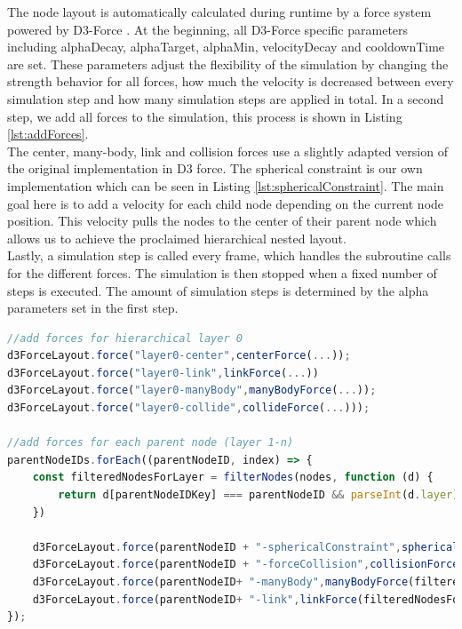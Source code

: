 The node layout is automatically calculated during runtime by a force system powered by D3-Force \cite{bostock_d3forcejs_nodate}. At the beginning, all D3-Force specific parameters including alphaDecay, alphaTarget, alphaMin, velocityDecay and cooldownTime are set. 
These parameters adjust the flexibility of the simulation by changing the strength behavior for all forces, how much the velocity is decreased between every simulation step and how many simulation steps are applied in total.
In a second step, we add all forces to the simulation, this process is shown in Listing \ref{lst:addForces}.\\
The center, many-body, link and collision forces use a slightly adapted version of the original implementation in D3 force. 
The spherical constraint is our own implementation which can be seen in Listing \ref{lst:sphericalConstraint}. The main goal here is to add a velocity for each child node depending on the current node position. This velocity pulls the nodes to the center of their parent node which allows us to achieve the proclaimed hierarchical nested layout.\\
Lastly, a simulation step is called every frame, which handles the subroutine calls for the different forces. The simulation is then stopped when a fixed number of steps is executed. The amount of simulation steps is determined by the alpha parameters set in the first step.

\begin{lstlisting}[language=JavaScript,label={lst:addForces},caption=Simplified algorithm that shows which forces are added to the simulation.] 
//add forces for hierarchical layer 0
d3ForceLayout.force("layer0-center",centerForce(...));
d3ForceLayout.force("layer0-link",linkForce(...))
d3ForceLayout.force("layer0-manyBody",manyBodyForce(...));
d3ForceLayout.force("layer0-collide",collideForce(...)));

//add forces for each parent node (layer 1-n)
parentNodeIDs.forEach((parentNodeID, index) => {
    const filteredNodesForLayer = filterNodes(nodes, function (d) {
        return d[parentNodeIDKey] === parentNodeID && parseInt(d.layer) === childLayer;
    })

    d3ForceLayout.force(parentNodeID + "-sphericalConstraint",sphericalConstraint(filteredNodesForLayer,...));
    d3ForceLayout.force(parentNodeID + "-forceCollision",collisionForce(filteredNodesForLayer,...));
    d3ForceLayout.force(parentNodeID+ "-manyBody",manyBodyForce(filteredNodesForLayer,...));
    d3ForceLayout.force(parentNodeID+ "-link",linkForce(filteredNodesForLayer,...));
});
\end{lstlisting}
\pagebreak


